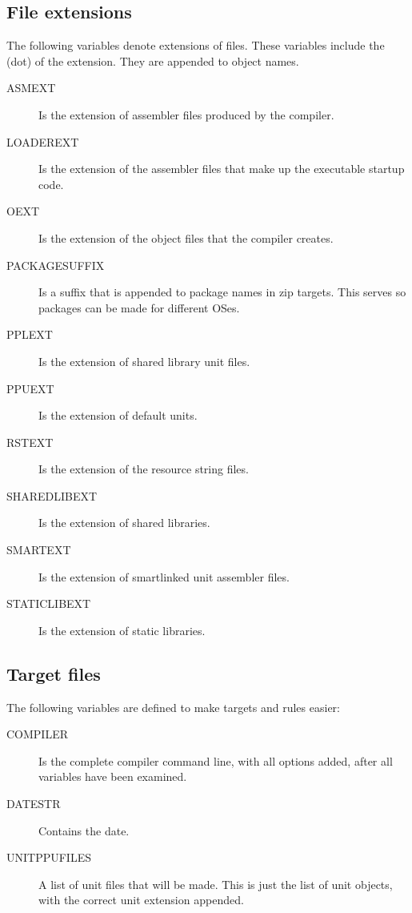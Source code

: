 \subsection{File extensions}

The following variables denote extensions of files. These variables include
the  (dot) of the extension. They are appended to object names.

\begin{description}
\item[ASMEXT] Is the extension of assembler files produced by the compiler.
\item[LOADEREXT] Is the extension of the assembler files that make up the
executable startup code.
\item[OEXT] Is the extension of the  object files that the compiler creates.
\item[PACKAGESUFFIX] Is a suffix that is appended to package names in zip
targets. This serves so packages can be made for different OSes.
\item[PPLEXT] Is the extension of shared library unit files.
\item[PPUEXT] Is the extension of default units.
\item[RSTEXT] Is the extension of the  resource string files.
\item[SHAREDLIBEXT] Is the extension of shared libraries.
\item[SMARTEXT] Is the extension of smartlinked unit assembler files.
\item[STATICLIBEXT] Is the extension of static libraries.
\end{description}

\subsection{Target files}

The following variables are defined to make targets and rules easier:
\begin{description}
\item[COMPILER] Is the complete compiler command line, with all options
added, after all  variables have been examined.
\item[DATESTR] Contains the date.
\item[UNITPPUFILES] A list of unit files that will be made. This is just
the list of unit objects, with the correct unit extension appended.
\end{description}

